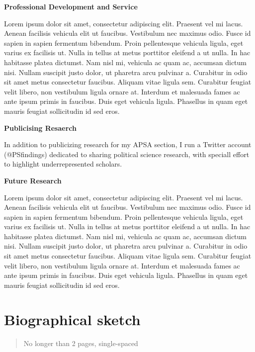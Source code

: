 \documentclass[
      12pt,
        ]{article}
\begin{document}
\textbf{Professional Development and Service}

Lorem ipsum dolor sit amet, consectetur adipiscing elit. Praesent vel mi lacus. Aenean facilisis vehicula elit ut faucibus. Vestibulum nec maximus odio. Fusce id sapien in sapien fermentum bibendum. Proin pellentesque vehicula ligula, eget varius ex facilisis ut. Nulla in tellus at metus porttitor eleifend a ut nulla. In hac habitasse platea dictumst. Nam nisl mi, vehicula ac quam ac, accumsan dictum nisi. Nullam suscipit justo dolor, ut pharetra arcu pulvinar a. Curabitur in odio sit amet metus consectetur faucibus. Aliquam vitae ligula sem. Curabitur feugiat velit libero, non vestibulum ligula ornare at. Interdum et malesuada fames ac ante ipsum primis in faucibus. Duis eget vehicula ligula. Phasellus in quam eget mauris feugiat sollicitudin id sed eros.

\textbf{Publicising Resaerch}

In addition to publicizing research for my APSA section, I run a Twitter account (@PSfindings) dedicated to sharing political science research, with speciall effort to highlight underrepresented scholars.

\textbf{Future Research}

Lorem ipsum dolor sit amet, consectetur adipiscing elit. Praesent vel mi lacus. Aenean facilisis vehicula elit ut faucibus. Vestibulum nec maximus odio. Fusce id sapien in sapien fermentum bibendum. Proin pellentesque vehicula ligula, eget varius ex facilisis ut. Nulla in tellus at metus porttitor eleifend a ut nulla. In hac habitasse platea dictumst. Nam nisl mi, vehicula ac quam ac, accumsan dictum nisi. Nullam suscipit justo dolor, ut pharetra arcu pulvinar a. Curabitur in odio sit amet metus consectetur faucibus. Aliquam vitae ligula sem. Curabitur feugiat velit libero, non vestibulum ligula ornare at. Interdum et malesuada fames ac ante ipsum primis in faucibus. Duis eget vehicula ligula. Phasellus in quam eget mauris feugiat sollicitudin id sed eros.

\newpage

\hypertarget{biographical-sketch}{%
\section{Biographical sketch}\label{biographical-sketch}}

\begin{quote}
No longer than 2 pages, single-spaced
\end{quote}
\end{document}
